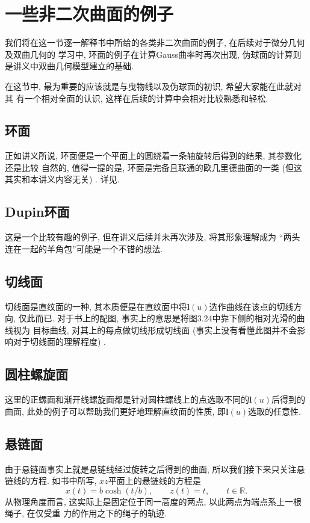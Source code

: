 \documentclass[./main.tex]{subfiles}
\begin{document}
\section{一些非二次曲面的例子}
我们将在这一节逐一解释书中所给的各类非二次曲面的例子, 在后续对于微分几何及双曲几何的
学习中, 环面的例子在计算Gauss曲率时再次出现, 伪球面的计算则是讲义中双曲几何模型建立的基础. 

在这节中, 最为重要的应该就是与曳物线以及伪球面的初识, 希望大家能在此就对其
有一个相对全面的认识, 这样在后续的计算中会相对比较熟悉和轻松. 
\subsection{环面}
正如讲义所说, 环面便是一个平面上的圆绕着一条轴旋转后得到的结果, 其参数化还是比较
自然的, 值得一提的是, 环面是完备且联通的欧几里德曲面的一类 (但这其实和本讲义内容无关) . 详见\cite{gos}.
\subsection{Dupin环面}
这是一个比较有趣的例子, 但在讲义后续并未再次涉及, 将其形象理解成为
``两头连在一起的羊角包''可能是一个不错的想法. 
\subsection{切线面}\label{3.6.3}
切线面是直纹面的一种, 其本质便是在直纹面中将$\mathbf{l}(u)$选作曲线在该点的切线方向, 仅此而已. 对于书上的配图, 事实上的意思是将图3.24中靠下侧的相对光滑的曲线视为
目标曲线, 对其上的每点做切线形成切线面 (事实上没有看懂此图并不会影响对于切线面的理解程度) . 
\subsection{圆柱螺旋面}\label{3.6.4}
这里的正螺面和渐开线螺旋面都是针对圆柱螺线上的点选取不同的$\mathbf{l}(u)$后得到的
曲面, 此处的例子可以帮助我们更好地理解直纹面的性质, 即$\mathbf{l}(u)$选取的任意性. 
\subsection{悬链面}
由于悬链面事实上就是悬链线经过旋转之后得到的曲面, 所以我们接下来只关注悬链线的方程. 
如书中所写, $xz$平面上的悬链线的方程是
\[
x(t)=b\cosh(t/b),\qquad z(t)=t,\qquad t\in\mathbb{R}.
\]
从物理角度而言, 这实际上是固定位于同一高度的两点, 以此两点为端点系上一根绳子, 在仅受重
力的作用之下的绳子的轨迹. 
\end{document}

